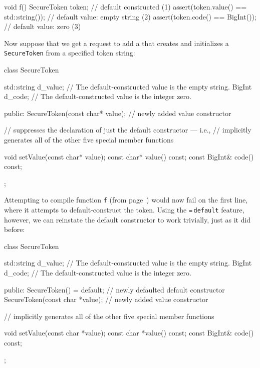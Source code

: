 \begin{emcppslisting}[language=C++,label=default-voidf-code]
void f()
{
    SecureToken token;                       // default constructed         (1)
    assert(token.value() == std::string());  // default value: empty string (2)
    assert(token.code() == BigInt());        // default value: zero         (3)
}
\end{emcppslisting}

\noindent Now suppose that we get a request to add a 
that creates and initializes a \lstinline!SecureToken! from a specified
token string:

\begin{emcppslisting}[language=C++]
class SecureToken
{
    std::string d_value;  // The default-constructed value is the empty string.
    BigInt      d_code;   // The default-constructed value is the integer zero.

public:
    SecureToken(const char* value);  // newly added value constructor

    // suppresses the declaration of just the default constructor --- i.e.,
    // implicitly generates all of the other five special member functions

    void setValue(const char* value);
    const char* value() const;
    const BigInt& code() const;
};
\end{emcppslisting}

\noindent Attempting to compile function \lstinline!f! (from page~\pageref{default-voidf-code}) would now fail on the
first line, where it attempts to default-construct the token. Using
the \lstinline!=!\,\lstinline!default! feature, however, we can reinstate the
default constructor to work trivially, just as
it did before:

\begin{emcppslisting}[language=C++]
class SecureToken
{
    std::string d_value;  // The default-constructed value is the empty string.
    BigInt d_code;        // The default-constructed value is the integer zero.

public:
    SecureToken() = default;         // newly defaulted default constructor
    SecureToken(const char *value);  // newly added value constructor

    // implicitly generates all of the other five special member functions

    void setValue(const char *value);
    const char *value() const;
    const BigInt& code() const;
};
\end{emcppslisting}


